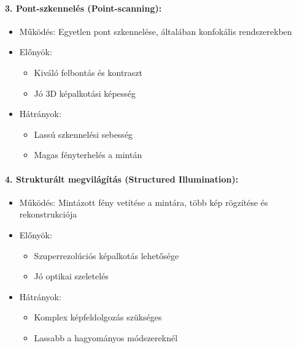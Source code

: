 \documentclass[a4paper,12pt]{article}
\begin{document}
\paragraph{3. Pont-szkennelés (Point-scanning):} \begin{itemize} \item Működés: Egyetlen pont szkennelése, általában konfokális rendszerekben \item Előnyök: \begin{itemize} \item Kiváló felbontás és kontraszt \item Jó 3D képalkotási képesség \end{itemize} \item Hátrányok: \begin{itemize} \item Lassú szkennelési sebesség \item Magas fényterhelés a mintán \end{itemize} \end{itemize}

\paragraph{4. Strukturált megvilágítás (Structured Illumination):} \begin{itemize} \item Működés: Mintázott fény vetítése a mintára, több kép rögzítése és rekonstrukciója \item Előnyök: \begin{itemize} \item Szuperrezolúciós képalkotás lehetősége \item Jó optikai szeletelés \end{itemize} \item Hátrányok: \begin{itemize} \item Komplex képfeldolgozás szükséges \item Lassabb a hagyományos módszereknél \end{itemize} \end{itemize}
\end{document}
